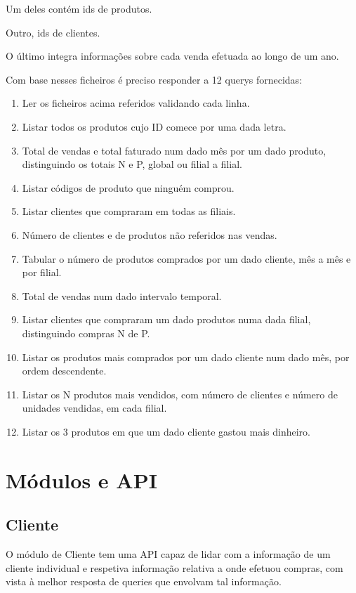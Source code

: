 \documentclass[a4paper]{report}
\begin{document}
Um deles contém ids de produtos.

Outro, ids de clientes.

O último integra informações sobre cada venda efetuada ao longo de um ano. 

Com base nesses ficheiros é preciso responder a 12 querys fornecidas:

\begin{enumerate}
    \item Ler os ficheiros acima referidos validando cada linha.
    \item Listar todos os produtos cujo ID comece por uma dada letra.
    \item Total de vendas e total faturado num dado mês por um dado produto, distinguindo os totais N e P, global ou filial a filial.
    \item Listar códigos de produto que ninguém comprou.
    \item Listar clientes que compraram em todas as filiais.
    \item Número de clientes e de produtos não referidos nas vendas.
    \item Tabular o número de produtos comprados por um dado cliente, mês a mês e por filial.
    \item Total de vendas num dado intervalo temporal.
    \item Listar clientes que compraram um dado produtos numa dada filial, distinguindo compras N de P.
    \item Listar os produtos mais comprados por um dado cliente num dado mês, por ordem descendente.
    \item Listar os N produtos mais vendidos, com número de clientes e número de unidades vendidas, em cada filial. 
    \item Listar os 3 produtos em que um dado cliente gastou mais dinheiro.
\end{enumerate}

\chapter{Módulos e API}\label{chap:api}

\section{Cliente}

O módulo de Cliente tem uma API capaz de lidar com a informação de um cliente
individual e respetiva informação relativa a onde efetuou compras, com vista
à melhor resposta de queries que envolvam tal informação.
\end{document}
